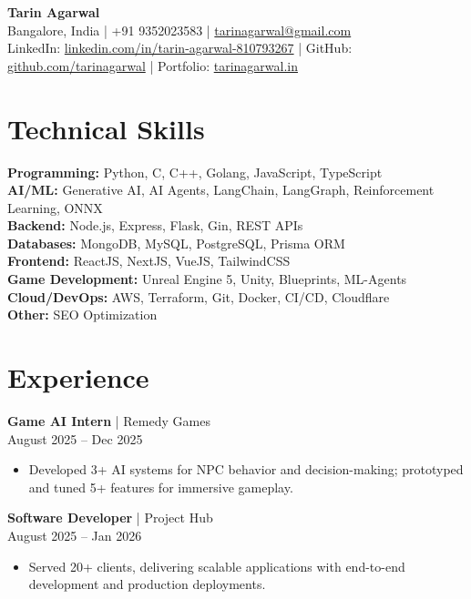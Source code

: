 \documentclass[10pt,a4paper]{article}
\begin{document}
\begin{center}
{\LARGE \textbf{Tarin Agarwal}} \\[6pt]
Bangalore, India | +91 9352023583 | \href{mailto:tarinagarwal@gmail.com}{tarinagarwal@gmail.com} \\
LinkedIn: \href{https://linkedin.com/in/tarin-agarwal-810793267}{linkedin.com/in/tarin-agarwal-810793267} | GitHub: \href{https://github.com/tarinagarwal}{github.com/tarinagarwal} | Portfolio: \href{https://tarinagarwal.in}{tarinagarwal.in}
\end{center}

\section*{Technical Skills}
\textbf{Programming:} Python, C, C++, Golang, JavaScript, TypeScript \\
\textbf{AI/ML:} Generative AI, AI Agents, LangChain, LangGraph, Reinforcement Learning, ONNX \\
\textbf{Backend:} Node.js, Express, Flask, Gin, REST APIs \\
\textbf{Databases:} MongoDB, MySQL, PostgreSQL, Prisma ORM \\
\textbf{Frontend:} ReactJS, NextJS, VueJS, TailwindCSS \\
\textbf{Game Development:} Unreal Engine 5, Unity, Blueprints, ML-Agents \\
\textbf{Cloud/DevOps:} AWS, Terraform, Git, Docker, CI/CD, Cloudflare \\
\textbf{Other:} SEO Optimization

\section*{Experience}

\textbf{Game AI Intern} | Remedy Games \\
August 2025 -- Dec 2025
\begin{itemize}
\item Developed 3+ AI systems for NPC behavior and decision-making; prototyped and tuned 5+ features for immersive gameplay.
\end{itemize}

\textbf{Software Developer} | Project Hub \\
August 2025 -- Jan 2026
\begin{itemize}
\item Served 20+ clients, delivering scalable applications with end-to-end development and production deployments.
\end{itemize}
\end{document}
